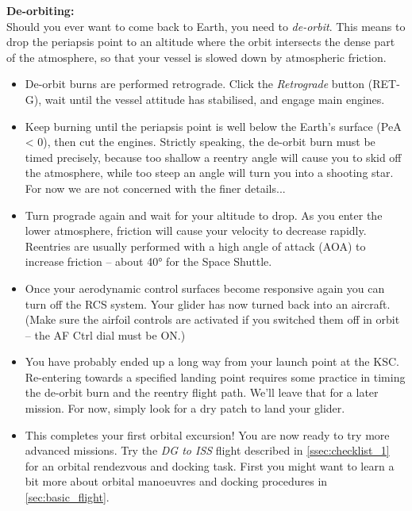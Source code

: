 \documentclass[Orbiter User Manual.tex]{subfiles}
\begin{document}
\noindent
\begin{figure}[H]
	\centering
\end{figure}

\noindent
\textbf{De-orbiting:}\\
Should you ever want to come back to Earth, you need to \textit{de-orbit}. This means to drop the periapsis point to an altitude where the orbit intersects the dense part of the atmosphere, so that your vessel is slowed down by atmospheric friction.

\begin{itemize}
\item De-orbit burns are performed retrograde. Click the \textit{Retrograde} button (RET-G), wait until the vessel attitude has stabilised, and engage main engines.
\item Keep burning until the periapsis point is well below the Earth's surface (PeA < 0), then cut the engines. Strictly speaking, the de-orbit burn must be timed precisely, because too shallow a reentry angle will cause you to skid off the atmosphere, while too steep an angle will turn you into a shooting star. For now we are not concerned with the finer details...
\item Turn prograde again and wait for your altitude to drop. As you enter the lower atmosphere, friction will cause your velocity to decrease rapidly. Reentries are usually performed with a high angle of attack (AOA) to increase friction – about 40° for the Space Shuttle.
\item Once your aerodynamic control surfaces become responsive again you can turn off the RCS system. Your glider has now turned back into an aircraft. (Make sure the airfoil controls are activated if you switched them off in orbit – the AF Ctrl dial must be ON.)
\item You have probably ended up a long way from your launch point at the KSC. Re-entering towards a specified landing point requires some practice in timing the de-orbit burn and the reentry flight path. We'll leave that for a later mission. For now, simply look for a dry patch to land your glider.
\item This completes your first orbital excursion!
You are now ready to try more advanced missions. Try the \textit{DG to ISS} flight described in \ref{ssec:checklist_1} for an orbital rendezvous and docking task. First you might want to learn a bit more about orbital manoeuvres and docking procedures in \ref{sec:basic_flight}.
\end{itemize}
\end{document}
